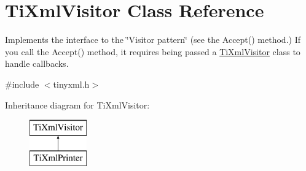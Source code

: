\hypertarget{class_ti_xml_visitor}{
\section{TiXmlVisitor Class Reference}
\label{class_ti_xml_visitor}
}


Implements the interface to the \char`\"{}Visitor pattern\char`\"{} (see the Accept() method.) If you call the Accept() method, it requires being passed a \hyperlink{class_ti_xml_visitor}{TiXmlVisitor} class to handle callbacks.  




{\ttfamily \#include $<$tinyxml.h$>$}

Inheritance diagram for TiXmlVisitor:\begin{figure}[H]
\begin{center}
\leavevmode
\includegraphics[height=2.000000cm]{class_ti_xml_visitor}
\end{center}
\end{figure}
